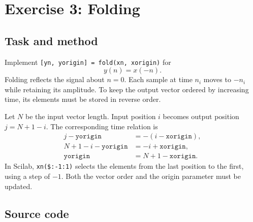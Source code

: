 \section{Exercise 3: Folding}
\subsection{Task and method}
Implement \texttt{[yn, yorigin] = fold(xn, xorigin)} for
\begin{equation}
  y(n)=x(-n).
\end{equation}
Folding reflects the signal about $n=0$. Each sample at time $n_i$
moves to $-n_i$ while retaining its amplitude. To keep the output vector
ordered by increasing time, its elements must be stored in reverse order.

Let $N$ be the input vector length. Input position $i$ becomes output
position $j=N+1-i$. The corresponding time relation is
\begin{align}
  j-\texttt{yorigin} &= -(i-\texttt{xorigin}),\\
  N+1-i-\texttt{yorigin} &= -i+\texttt{xorigin},\\
  \texttt{yorigin} &= N+1-\texttt{xorigin}.
\end{align}
In Scilab, \texttt{xn(\$:-1:1)} selects the elements from the last
position to the first, using a step of $-1$. Both the vector order and
the origin parameter must be updated.

\subsection{Source code}


